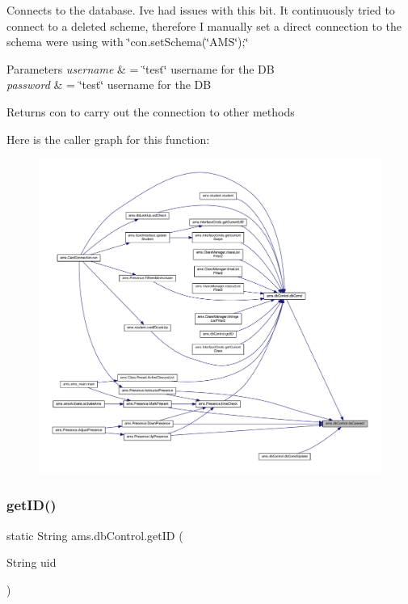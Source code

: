 Connects to the database. I\textquotesingle{}ve had issues with this bit. It continuously tried to connect to a deleted scheme, therefore I manually set a direct connection to the schema we\textquotesingle{}re using with \char`\"{}con.\+set\+Schema(\char`\"{}A\+MS\char`\"{});\char`\"{} 
\begin{DoxyParams}{Parameters}
{\em username} & = \char`\"{}test\char`\"{} username for the DB \\
\hline
{\em password} & = \char`\"{}test\char`\"{} username for the DB \\
\hline
\end{DoxyParams}
\begin{DoxyReturn}{Returns}
con to carry out the connection to other methods 
\end{DoxyReturn}
Here is the caller graph for this function\+:\nopagebreak
\begin{figure}[H]
\begin{center}
\leavevmode
\includegraphics[width=350pt]{classams_1_1db_control_a76fc97489ad6acec2ec72d644e935362_icgraph}
\end{center}
\end{figure}
\mbox{\label{classams_1_1db_control_ac130c7d3b8e1b37cfcacc3f05b9562d2}} 
\subsubsection{\texorpdfstring{getID()}{getID()}}
{\footnotesize\ttfamily static String ams.\+db\+Control.\+get\+ID (\begin{DoxyParamCaption}\item[{String}]{uid }\end{DoxyParamCaption})\hspace{0.3cm}{\ttfamily [static]}}

